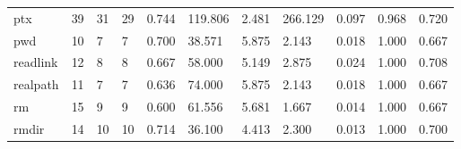 \begin{longtable}{lp{1.2cm}p{1.2cm}p{1.2cm}p{1.2cm}p{1.2cm}p{1.2cm}p{1.2cm}p{1.2cm}p{1.2cm}p{1.2cm}}
ptx       &                           39 &                 31 &                                29 &                                      0.744 &                                119.806 &                                        2.481 &                           266.129 &                                   0.097 &                              0.968 &                                              0.720 \\
pwd       &                           10 &                  7 &                                 7 &                                      0.700 &                                 38.571 &                                        5.875 &                             2.143 &                                   0.018 &                              1.000 &                                              0.667 \\
readlink  &                           12 &                  8 &                                 8 &                                      0.667 &                                 58.000 &                                        5.149 &                             2.875 &                                   0.024 &                              1.000 &                                              0.708 \\
realpath  &                           11 &                  7 &                                 7 &                                      0.636 &                                 74.000 &                                        5.875 &                             2.143 &                                   0.018 &                              1.000 &                                              0.667 \\
rm        &                           15 &                  9 &                                 9 &                                      0.600 &                                 61.556 &                                        5.681 &                             1.667 &                                   0.014 &                              1.000 &                                              0.667 \\
rmdir     &                           14 &                 10 &                                10 &                                      0.714 &                                 36.100 &                                        4.413 &                             2.300 &                                   0.013 &                              1.000 &                                              0.700 \\

\end{longtable}
